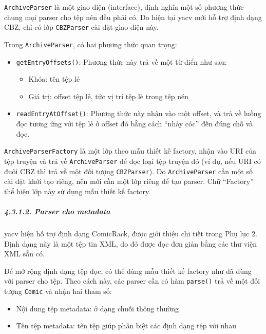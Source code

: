 \documentclass[
]{article}
\providecommand{\tightlist}{%
  \setlength{\itemsep}{0pt}\setlength{\parskip}{0pt}}
\begin{document}
\texttt{ArchiveParser} là một giao diện (interface), định nghĩa một số
phương thức chung mọi parser cho tệp nén đều phải có. Do hiện tại yacv
mới hỗ trợ định dạng CBZ, chỉ có lớp \texttt{CBZParser} cài đặt giao
diện này.

Trong \texttt{ArchiveParser}, có hai phương thức quan trọng:

\begin{itemize}
\item
  \texttt{getEntryOffsets()}: Phương thức này trả về một từ điển như
  sau:

  \begin{itemize}
  \tightlist
  \item
    Khóa: tên tệp lẻ
  \item
    Giá trị: offset tệp lẻ, tức vị trí tệp lẻ trong tệp nén
  \end{itemize}
\item
  \texttt{readEntryAtOffset()}: Phương thức này nhận vào một offset, và
  trả về luồng đọc tương ứng với tệp lẻ ở offset đó bằng cách ``nhảy
  cóc'' đến đúng chỗ và đọc.
\end{itemize}

\texttt{ArchiveParserFactory} là một lớp theo mẫu thiết kế factory, nhận
vào URI của tệp truyện và trả về \texttt{ArchiveParser} để đọc loại tệp
truyện đó (ví dụ, nếu URI có đuôi CBZ thì trả về một đối tượng
\texttt{CBZParser}). Do \texttt{ArchiveParser} cần một số cài đặt khởi
tạo riêng, nên mới cần một lớp riêng để tạo parser. Chữ ``Factory'' thể
hiện lớp này sử dụng mẫu thiết kế factory.

\hypertarget{parser-cho-metadata}{%
\subparagraph{4.3.1.2. Parser cho metadata}\label{parser-cho-metadata}}

yacv hiện hỗ trợ định dạng ComicRack, được giới thiệu chi tiết trong Phụ
lục 2. Định dạng này là một tệp tin XML, do đó được đọc đơn giản bằng
các thư viện XML sẵn có.

Để mở rộng định dạng tệp đọc, có thể dùng mẫu thiết kế factory như đã
dùng với parser cho tệp. Theo cách này, các parser cần có hàm
\texttt{parse()} trả về một đối tượng \texttt{Comic} và nhận hai tham
số:

\begin{itemize}
\tightlist
\item
  Nội dung tệp metadata: ở dạng chuỗi thông thường
\item
  Tên tệp metadata: tên tệp giúp phân biệt các định dạng tệp với nhau
\end{itemize}
\end{document}
